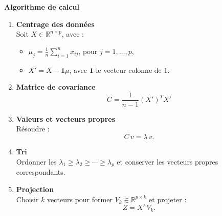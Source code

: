 \documentclass[a4paper,12pt]{report} %
\begin{document}
\textbf{Algorithme de calcul}
\footnotesize
\begin{enumerate}
    \item \textbf{Centrage des données} \\
    Soit $X\in\mathbb{R}^{n\times p}$, avec :
    \begin{itemize}
        \item $\mu_j=\frac{1}{n}\sum_{i=1}^{n}x_{ij}$, pour $j=1,\dots,p$,
        \item $X'=X-\mathbf{1}\mu$, avec $\mathbf{1}$ le vecteur colonne de 1.
    \end{itemize}
    \item \textbf{Matrice de covariance} \\
    \[
    C=\frac{1}{n-1}(X')^T X'
    \]
    \item \textbf{Valeurs et vecteurs propres} \\
    Résoudre :
    \[
    C\,v=\lambda\,v.
    \]
    \item \textbf{Tri} \\
    Ordonner les $\lambda_1\ge\lambda_2\ge\cdots\ge\lambda_p$ et conserver les vecteurs propres correspondants.
    \item \textbf{Projection} \\
    Choisir $k$ vecteurs pour former $V_k\in\mathbb{R}^{p\times k}$ et projeter :
    \[
    Z=X'\,V_k.
    \]
\end{enumerate}
\end{document}
